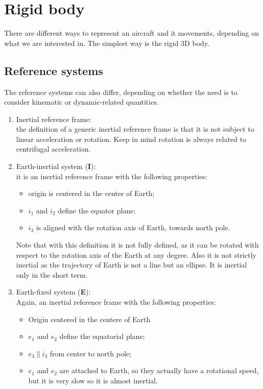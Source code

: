 \section{Rigid body}
There are different ways to represent an aircraft and it movements, depending on what we are interested in. The simplest way is the rigid 3D body.
\subsection{Reference systems}
\label{sec: reference frames}
The reference systems can also differ, depending on whether the need is to consider kinematic or dynamic-related quantities.
\\

\begin{enumerate}
    \item Inertial reference frame:\\
    the definition of a generic inertial reference frame is that it is not subject to linear acceleration or rotation. Keep in mind rotation is always related to centrifugal acceleration.
    \item Earth-inertial system (\textbf{I}):\\
    it is an inertial reference frame with the following properties:
    \begin{itemize}
        \item origin is centered in the center of Earth;
        \item $i_1$ and $i_2$ define the equator plane;
        \item $i_3$ is aligned with the rotation axis of Earth, towards north pole.
    \end{itemize}
    Note that with this definition it is not fully defined, as it can be rotated with respect to the rotation axis of the Earth at any degree. Also it is not strictly inertial as the trajectory of Earth is not a line but an ellipse. It is inertial only in the short term.
    \item Earth-fixed system (\textbf{E}):
    \\
    Again, an inertial reference frame with the following properties:
    \begin{itemize}
        \item Origin centered in the centere of Earth
        \item $e_1$ and $e_2$ define the equatorial plane;
        \item $e_3 \parallel i_3$ from center to north pole;
        \item $e_1$ and $e_2$ are attached to Earth, so they actually have a rotational speed, but it is very slow so it is almost inertial.

\end{itemize}
\end{enumerate}
